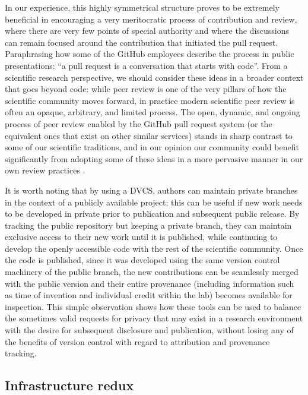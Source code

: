 \documentclass[ChapterTOCs,krantz2]{krantz} %
\begin{document}
In our experience, this highly symmetrical structure proves to be extremely
beneficial in encouraging a very meritocratic process of contribution and
review, where there are very few points of special authority and where the
discussions can remain focused around the contribution that initiated the pull
request.  Paraphrasing how some of the GitHub employees describe the process in
public presentations: ``a pull request is a conversation that starts with
code''.  From a scientific research perspective, we should consider these ideas
in a broader context that goes beyond code: while peer review is one of the
very pillars of how the scientific community moves forward, in practice modern
scientific peer review is often an opaque, arbitrary, and limited process.  The
open, dynamic, and ongoing process of peer review enabled by the GitHub pull
request system (or the equivalent ones that exist on other similar services)
stands in sharp contrast to some of our scientific traditions, and in our
opinion our community could benefit significantly from adopting some of these
ideas in a more pervasive manner in our own review practices
\cite{10.3389/fncom.2012.00018}.

It is worth noting that by using a DVCS, authors can maintain private branches
in the context of a publicly available project; this can be useful if new work
needs to be developed in private prior to publication and subsequent public
release. By tracking the public repository but keeping a private branch, they
can maintain exclusive access to their new work until it is published, while
continuing to develop the openly accessible code with the rest of the
scientific community. Once the code is published, since it was developed using
the same version control machinery of the public branch, the new contributions
can be seamlessly merged with the public version and their entire provenance
(including information such as time of invention and individual credit within
the lab) becomes available for inspection.  This simple observation shows how
these tools can be used to balance the sometimes valid requests for privacy
that may exist in a research environment with the desire for subsequent
disclosure and publication, without losing any of the benefits of version
control with regard to attribution and provenance tracking.

\subsection{Infrastructure redux}
\end{document}
